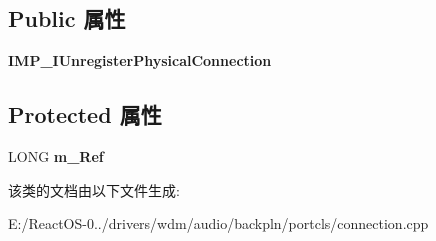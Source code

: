 \subsection*{Public 属性}
\begin{DoxyCompactItemize}
\item 
\mbox{\label{class_c_unregister_physical_connection_a5e182ab6024a048b3987402dff4de55d}} 
{\bfseries I\+M\+P\+\_\+\+I\+Unregister\+Physical\+Connection}
\end{DoxyCompactItemize}
\subsection*{Protected 属性}
\begin{DoxyCompactItemize}
\item 
\mbox{\label{class_c_unregister_physical_connection_a154aa4335097718ec44a5c3d96004522}} 
L\+O\+NG {\bfseries m\+\_\+\+Ref}
\end{DoxyCompactItemize}


该类的文档由以下文件生成\+:\begin{DoxyCompactItemize}
\item 
E\+:/\+React\+O\+S-\/0../drivers/wdm/audio/backpln/portcls/connection.\+cpp\end{DoxyCompactItemize}
